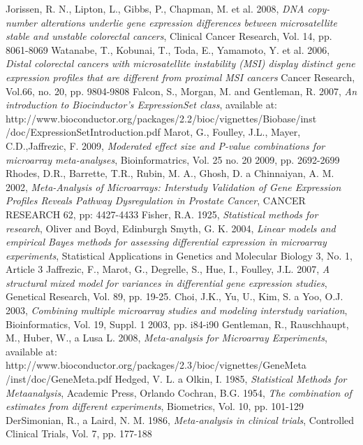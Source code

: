 \documentclass[a4paper]{report}
\begin{document}
\begin{thebibliography}{99}
Jorissen, R. N., Lipton, L., Gibbs, P., Chapman, M. et al. 2008, \emph{DNA copy-number alterations underlie gene expression differences between microsatellite stable and unstable colorectal cancers}, Clinical Cancer Research, Vol. 14, pp. 8061-8069
Watanabe, T., Kobunai, T., Toda, E., Yamamoto, Y. et al. 2006, \emph{Distal colorectal cancers with microsatellite instability (MSI) display distinct gene expression profiles that are different from proximal MSI cancers} Cancer Research, Vol.66, no. 20, pp. 9804-9808
Falcon, S., Morgan, M. and Gentleman, R. 2007, \emph{An introduction to Biocinductor's ExpressionSet class}, available at: http://www.bioconductor.org/packages/2.2/bioc/vignettes/Biobase/inst /doc/ExpressionSetIntroduction.pdf
Marot, G., Foulley, J.L., Mayer, C.D.,Jaffrezic, F. 2009, \emph{Moderated effect size and P-value combinations for microarray meta-analyses}, Bioinformatrics, Vol. 25 no. 20 2009, pp. 2692-2699
Rhodes, D.R., Barrette, T.R., Rubin, M. A., Ghosh, D. a Chinnaiyan, A. M. 2002, \emph{Meta-Analysis of Microarrays: Interstudy Validation of Gene Expression Profiles Reveals Pathway Dysregulation in Prostate Cancer}, CANCER RESEARCH 62, pp: 4427-4433
Fisher, R.A. 1925, \emph{Statistical methods for research}, Oliver and Boyd, Edinburgh
Smyth, G. K. 2004, \emph{Linear models and empirical Bayes methods for assessing differential expression in microarray experiments}, Statistical Applications in Genetics and Molecular Biology 3, No. 1, Article 3
Jaffrezic, F., Marot, G., Degrelle, S., Hue, I., Foulley, J.L. 2007, \emph{A structural mixed model for variances in differential gene expression studies}, Genetical Research, Vol. 89, pp. 19-25.
Choi, J.K., Yu, U., Kim, S. a Yoo, O.J. 2003, \emph{Combining multiple microarray studies and modeling interstudy variation}, Bioinformatics, Vol. 19, Suppl. 1 2003, pp. i84-i90
Gentleman, R., Rauschhaupt, M., Huber, W., a Lusa L. 2008, \emph{Meta-analysis for Microarray Experiments}, available at: http://www.bioconductor.org/packages/2.3/bioc/vignettes/GeneMeta /inst/doc/GeneMeta.pdf 
Hedged, V. L. a Olkin, I. 1985, \emph{Statistical Methods for Metaanalysis}, Academic Press, Orlando
Cochran, B.G. 1954, \emph{The combination of estimates from different experiments}, Biometrics, Vol. 10, pp. 101-129
DerSimonian, R., a Laird, N. M. 1986, \emph{Meta-analysis in clinical trials}, Controlled Clinical Trials, Vol. 7, pp. 177-188

\end{thebibliography}
\end{document}
